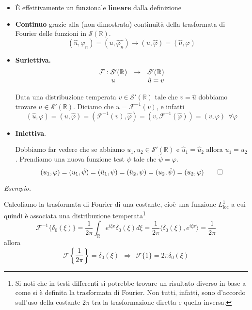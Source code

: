 \documentclass[10pt,a4paper,twoside]{book}
\begin{document}
\begin{itemize}
\item È effettivamente un funzionale \textbf{lineare} dalla definizione
\item \textbf{Continuo} grazie alla (non dimostrata) continuità della trasformata di Fourier delle funzioni in $\mathcal{S}(\mathbb{R})$.\begin{equation*}
(\hat{u} ,\varphi _{n}) =\left( u,\widehat{\varphi _{n}}\right)\rightarrow ( u,\hat{\varphi }) =(\hat{u} ,\varphi )
\end{equation*}
\item \textbf{Suriettiva.}\begin{equation*}
\begin{array}{ c c c }
\mathcal{F} :\mathcal{S} '(\mathbb{R}) & \rightarrow  & \mathcal{S} '(\mathbb{R})\\
u &  & \hat{u} =v
\end{array}
\end{equation*}

Data una distribuzione temperata $v\in \mathcal{S} '(\mathbb{R})$ tale che $v=\hat{u}$ dobbiamo trovare $u\in \mathcal{S} '(\mathbb{R})$. Diciamo che $u=\mathcal{F}^{-1}( v)$, e infatti\begin{equation*}
(\hat{u} ,\varphi ) =( u,\hat{\varphi }) =\left(\mathcal{F}^{-1}( v) ,\hat{\varphi }\right) =\left( v,\mathcal{F}^{-1}(\hat{\varphi })\right) =( v,\varphi ) \ \ \forall \varphi 
\end{equation*}
\item \textbf{Iniettiva}.

Dobbiamo far vedere che se abbiamo $u_{1} ,u_{2} \in \mathcal{S} '(\mathbb{R})$ e $\hat{u}_{1} =\hat{u}_{2}$ allora $u_{1} =u_{2}$. Prendiamo una nuova funzione test $\psi $ tale che $\hat{\psi } =\varphi $.\begin{equation*}
( u_{1} ,\varphi ) =( u_{1} ,\hat{\psi }) =(\hat{u}_{1} ,\psi ) =(\hat{u}_{2} ,\psi ) =( u_{2} ,\hat{\psi }) =( u_{2} ,\varphi )\qed 
\end{equation*}
\end{itemize}
\textit{Esempio.}

Calcoliamo la trasformata di Fourier di una costante, cioè una funzione $L^{1}_{\mathrm{loc}}$ a cui quindi è associata una distribuzione temperata\footnote{Si noti che in testi differenti si potrebbe trovare un risultato diverso in base a come si è definita la trasformata di Fourier. Non tutti, infatti, sono d'accordo sull'uso della costante $2\pi $ tra la trasformazione diretta e quella inversa.}
\begin{equation*}
\mathcal{F}^{-1}\{\delta _{0}( \xi )\} =\frac{1}{2\pi }\int _{\mathbb{R}} e^{i\xi x} \delta _{0}( \xi ) d\xi =\frac{1}{2\pi } \langle \delta _{0}( \xi ) ,e^{i\xi x} \rangle =\frac{1}{2\pi }
\end{equation*}
allora
\begin{equation*}
\mathcal{F}\left\{\frac{1}{2\pi }\right\} =\delta _{0}( \xi ) \ \ \Rightarrow \ \ \boxed{\mathcal{F}\{1\} =2\pi \delta _{0}( \xi )}
\end{equation*}
\end{document}
